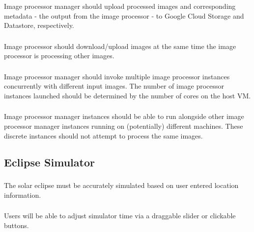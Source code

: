 \documentclass[10pt, onecolumn, draftclsnofoot, letterpaper, compsoc]{IEEEtran}
\begin{document}
    \subsubsection{} 
    Image processor manager should upload processed images and corresponding metadata 
    - the output from the image processor - to Google Cloud Storage and Datastore, respectively. \\

    \subsubsection{} 
    Image processor should download/upload images at the same time the image processor 
    is processing other images. \\

    \subsubsection{} 
    Image processor manager should invoke multiple image processor instances concurrently 
    with different input images. The number of image processor instances launched should be 
    determined by the number of cores on the host VM. \\

    \subsubsection{} 
    Image processor manager instances should be able to run alongside other image processor 
    manager instances running on (potentially) different machines. These discrete instances should 
    not attempt to process the same images. \\

\subsection{Eclipse Simulator}
    \subsubsection{}
    The solar eclipse must be accurately simulated based on
    user entered location information. \\

    \subsubsection{}
    Users will be able to adjust simulator time via a
    draggable slider or clickable buttons. \\
\end{document}
